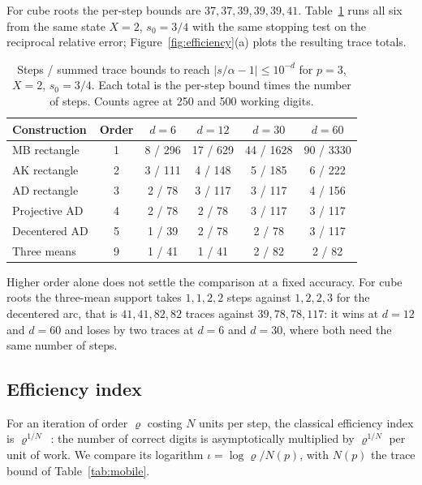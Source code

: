 For cube roots the per-step bounds are $37,37,39,39,39,41$. Table~\ref{tab:cubic} runs all six from the
same state $X=2$, $s_0=3/4$ with the same stopping test on the reciprocal relative error; Figure~\ref{fig:efficiency}(a) plots the resulting trace totals.

\begin{table}[htbp]
\centering\small
\caption{Steps / summed trace bounds to reach $|s/\alpha-1|\le10^{-d}$ for $p=3$, $X=2$, $s_0=3/4$.
Each total is the per-step bound times the number of steps. Counts agree at 250 and 500 working
digits.}\label{tab:cubic}
\begin{tabular}{@{}lccccc@{}}
\toprule
Construction & Order & $d=6$ & $d=12$ & $d=30$ & $d=60$\\
\midrule
MB rectangle & 1 & 8 / 296 & 17 / 629 & 44 / 1628 & 90 / 3330\\
AK rectangle & 2 & 3 / 111 & 4 / 148 & 5 / 185 & 6 / 222\\
AD rectangle & 3 & 2 / 78 & 3 / 117 & 3 / 117 & 4 / 156\\
Projective AD & 4 & 2 / 78 & 2 / 78 & 3 / 117 & 3 / 117\\
Decentered AD & 5 & 1 / 39 & 2 / 78 & 2 / 78 & 3 / 117\\
Three means & 9 & 1 / 41 & 1 / 41 & 2 / 82 & 2 / 82\\
\bottomrule
\end{tabular}
\end{table}

Higher order alone does not settle the comparison at a fixed accuracy. For cube roots the three-mean
support takes $1,1,2,2$ steps against $1,2,2,3$ for the decentered arc, that is $41,41,82,82$ traces
against $39,78,78,117$: it wins at $d=12$ and $d=60$ and loses by two traces at $d=6$ and $d=30$, where
both need the same number of steps.

\subsection{Efficiency index}

For an iteration of order $\varrho$ costing $N$ units per step, the classical efficiency index is
$\varrho^{1/N}$~\cite{ostrowski,traub64}: the number of correct digits is asymptotically multiplied by
$\varrho^{1/N}$ per unit of work. We compare its logarithm $\iota=\log\varrho/N(p)$, with $N(p)$ the
trace bound of Table~\ref{tab:mobile}.

